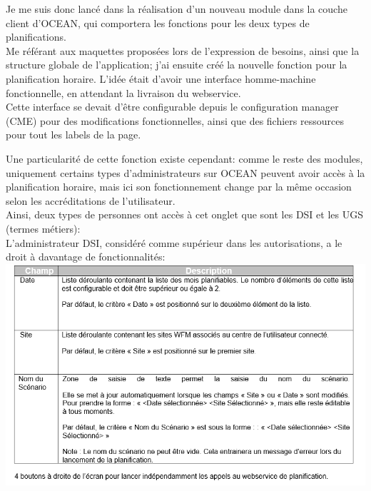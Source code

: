 \documentclass{rapport}
\begin{document}
\begin{minipage}{0.35\textwidth}
\end{minipage}
\begin{minipage}{0.55\textwidth}
Je me suis donc lancé dans la réalisation d'un nouveau module dans la couche client d'OCEAN, qui comportera les fonctions pour les deux types de planifications.\\
Me référant aux maquettes proposées lors de l'expression de besoins, ainsi que la structure globale de l'application; j'ai ensuite créé la nouvelle fonction pour la planification horaire. L'idée était d'avoir une interface homme-machine fonctionnelle, en attendant la livraison du webservice.\\

Cette interface se devait d'être configurable depuis le configuration manager (CME) pour des modifications fonctionnelles, ainsi que des fichiers ressources pour tout les labels de la page.
\end{minipage}
\vspace{5mm} %

Une particularité de cette fonction existe cependant: comme le reste des modules, uniquement certains types d'administrateurs sur OCEAN peuvent avoir accès à la planification horaire, mais ici son fonctionnement change par la même occasion selon les accréditations de l'utilisateur.\\
Ainsi, deux types de personnes ont accès à cet onglet que sont les DSI et les UGS (termes métiers):\\

L'administrateur DSI, considéré comme supérieur dans les autorisations, a le droit à davantage de fonctionnalités:\\
\includegraphics[width=.95\textwidth]{fig/fig18_PlanoHDSIFonct.png}
\end{document}
